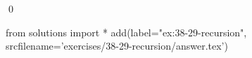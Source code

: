 
\begin{ex}
  \label{ex:38-29-recursion}
  
  \qed
\end{ex}
\begin{python0}
from solutions import *
add(label="ex:38-29-recursion",
    srcfilename='exercises/38-29-recursion/answer.tex')
\end{python0}
